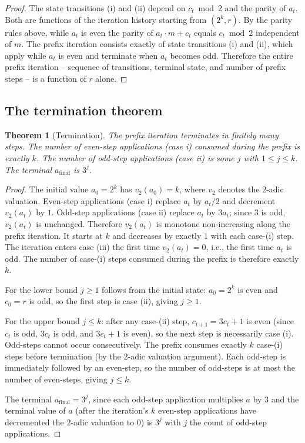 \documentclass[pdflatex,sn-mathphys-num]{sn-jnl}
\theoremstyle{thmstyleone}%
\newtheorem{theorem}{Theorem}[section]
\theoremstyle{definition}
\theoremstyle{plain}
\begin{document}
\begin{proof}
The state transitions (i) and (ii) depend on $c_t \bmod 2$ and the parity of $a_t$. Both are functions of the iteration history starting from $(2^k, r)$. By the parity rules above, while $a_t$ is even the parity of $a_t \cdot m + c_t$ equals $c_t \bmod 2$ independent of $m$. The prefix iteration consists exactly of state transitions (i) and (ii), which apply while $a_t$ is even and terminate when $a_t$ becomes odd. Therefore the entire prefix iteration -- sequence of transitions, terminal state, and number of prefix steps -- is a function of $r$ alone.
\end{proof}

\subsection{The termination theorem}
\label{sec:termination}

\begin{theorem}[Termination]
\label{thm:termination}
The prefix iteration terminates in finitely many steps. The number of even-step applications (case i) consumed during the prefix is exactly $k$. The number of odd-step applications (case ii) is some $j$ with $1 \leq j \leq k$. The terminal $a_{\text{final}}$ is $3^j$.
\end{theorem}

\begin{proof}
The initial value $a_0 = 2^k$ has $v_2(a_0) = k$, where $v_2$ denotes the $2$-adic valuation. Even-step applications (case i) replace $a_t$ by $a_t / 2$ and decrement $v_2(a_t)$ by $1$. Odd-step applications (case ii) replace $a_t$ by $3 a_t$; since $3$ is odd, $v_2(a_t)$ is unchanged. Therefore $v_2(a_t)$ is monotone non-increasing along the prefix iteration. It starts at $k$ and decreases by exactly $1$ with each case-(i) step. The iteration enters case (iii) the first time $v_2(a_t) = 0$, i.e., the first time $a_t$ is odd. The number of case-(i) steps consumed during the prefix is therefore exactly $k$.

For the lower bound $j \geq 1$ follows from the initial state: $a_0 = 2^k$ is even and $c_0 = r$ is odd, so the first step is case (ii), giving $j \geq 1$.

For the upper bound $j \leq k$: after any case-(ii) step, $c_{t+1} = 3c_t +1$ is even (since $c_t$ is odd, $3 c_t$ is odd, and $3 c_t + 1$ is even), so the next step is necessarily case (i). Odd-steps cannot occur consecutively. The prefix consumes exactly $k$ case-(i) steps before termination (by the $2$-adic valuation argument). Each odd-step is immediately followed by an even-step, so the number of odd-steps is at most the number of even-steps, giving $j \leq k$.
    
The terminal $a_{\text{final}} = 3^j$, since each odd-step application multiplies $a$ by $3$ and the terminal value of $a$ (after the iteration's $k$ even-step applications have decremented the 2-adic valuation to $0$) is $3^j$ with $j$ the count of odd-step applications.
\end{proof}
\end{document}

